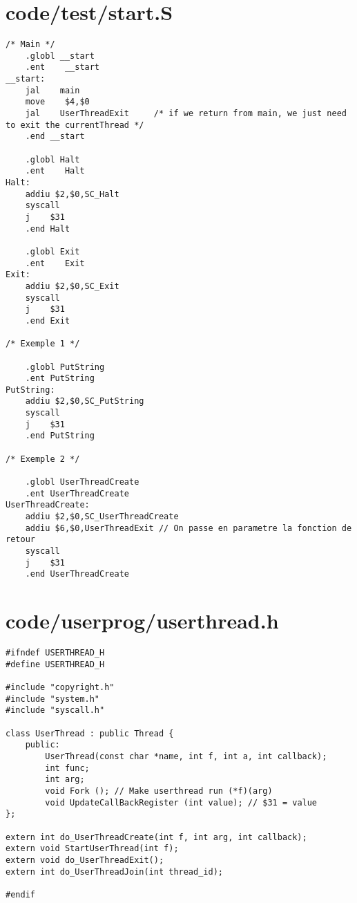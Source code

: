 \documentclass[a4paper,10pt]{article}
\begin{document}
\begin{titlepage}
\tableofcontents{}
\end{titlepage}

\section{code/test/start.S}
\begin{lstlisting}
/* Main */
    .globl __start
    .ent    __start
__start:
    jal    main
    move    $4,$0
    jal    UserThreadExit     /* if we return from main, we just need to exit the currentThread */
    .end __start

    .globl Halt
    .ent    Halt
Halt:
    addiu $2,$0,SC_Halt
    syscall
    j    $31
    .end Halt

    .globl Exit
    .ent    Exit
Exit:
    addiu $2,$0,SC_Exit
    syscall
    j    $31
    .end Exit

/* Exemple 1 */

    .globl PutString
    .ent PutString
PutString:
    addiu $2,$0,SC_PutString
    syscall
    j    $31
    .end PutString

/* Exemple 2 */

    .globl UserThreadCreate
    .ent UserThreadCreate
UserThreadCreate:
    addiu $2,$0,SC_UserThreadCreate
    addiu $6,$0,UserThreadExit // On passe en parametre la fonction de retour
    syscall
    j    $31
    .end UserThreadCreate
\end{lstlisting}

\section{code/userprog/userthread.h}
\begin{lstlisting}
#ifndef USERTHREAD_H
#define USERTHREAD_H

#include "copyright.h"
#include "system.h"
#include "syscall.h"

class UserThread : public Thread {
    public:
        UserThread(const char *name, int f, int a, int callback);
        int func;
        int arg;
        void Fork (); // Make userthread run (*f)(arg)
        void UpdateCallBackRegister (int value); // $31 = value
};

extern int do_UserThreadCreate(int f, int arg, int callback);
extern void StartUserThread(int f);
extern void do_UserThreadExit();
extern int do_UserThreadJoin(int thread_id);

#endif
\end{lstlisting}
\end{document}
